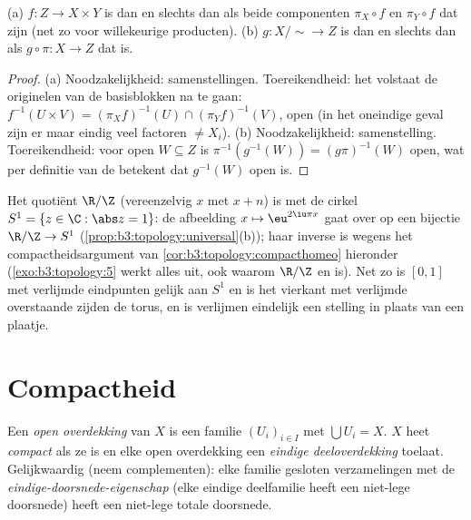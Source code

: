\begin{proposition}
\label{prop:b3:topology:universal}
(a) $f \colon Z \to X \times Y$ is  dan en slechts dan als
beide componenten $\pi_X \circ f$ en $\pi_Y \circ f$ dat zijn
(net zo voor willekeurige producten).
(b) $g \colon X/{\sim} \to Z$ is  dan en slechts dan als $g
\circ \pi \colon X \to Z$ dat is.
\end{proposition}

\begin{proof}
(a) Noodzakelijkheid: samenstellingen. Toereikendheid: het
volstaat de originelen van de basisblokken na te gaan: $f^{-1}(U
\times V) = (\pi_Xf)^{-1}(U) \cap (\pi_Yf)^{-1}(V)$, open (in het
oneindige geval zijn er maar eindig veel factoren $\neq X_i$). (b)
Noodzakelijkheid: samenstelling. Toereikendheid: voor open $W
\subseteq Z$ is $\pi^{-1}(g^{-1}(W)) = (g\pi)^{-1}(W)$ open, wat
per definitie van de  betekent dat $g^{-1}(W)$
open is.
\end{proof}

\begin{example}\label{ex:b3:topology:circle}
Het quotiënt $\R/\Z$ (vereenzelvig $x$ met $x + n$) is 
met de cirkel $S^1 = \{z \in \C : \abs z = 1\}$: de afbeelding $x
\mapsto \eu^{2\iu\pi x}$ gaat over op een  bijectie
$\R/\Z \to S^1$ (\cref{prop:b3:topology:universal}(b)); haar
inverse is  wegens het compactheidsargument van
\cref{cor:b3:topology:compacthomeo} hieronder
(\cref{exo:b3:topology:5} werkt alles uit, ook waarom $\R/\Z$
 en  is). Net zo is $[0,1]$ met verlijmde
eindpunten gelijk aan $S^1$ en is het vierkant met verlijmde
overstaande zijden de torus, en is verlijmen eindelijk een
stelling in plaats van een plaatje.
\end{example}

\section{Compactheid}

\begin{definition}\label{def:b3:topology:compact}
Een \emph{open overdekking} van $X$ is een familie
$(U_i)_{i\in I}$  met $\bigcup U_i = X$. $X$
heet \emph{compact} als ze  is en
elke open overdekking een \emph{eindige deeloverdekking} toelaat.
Gelijkwaardig (neem complementen): elke familie gesloten
verzamelingen met de \emph{eindige-doorsnede-eigenschap} (elke
eindige deelfamilie heeft een niet-lege doorsnede) heeft een
niet-lege totale doorsnede.
\end{definition}


